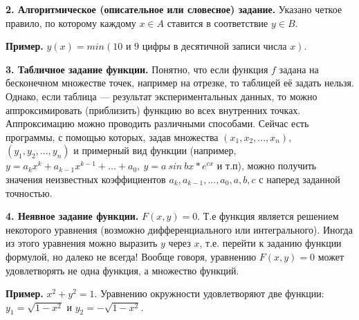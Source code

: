 \documentclass{article}
\begin{document}
    \textbf{2. Алгоритмическое (описательное или словесное) задание.} Указано четкое правило, по которому каждому $x \in A$ ставится в соответствие $y \in B$.
    
    \textbf{Пример.} $y(x) = min(10 \textrm{ и } 9 \textrm{ цифры в десятичной записи числа } x)$.

    \textbf{3. Табличное задание функции.} Понятно, что если функция $f$ задана на бесконечном множестве точек, например на отрезке, то таблицей её задать нельзя. Однако, если таблица --- результат экспериментальных данных, то можно аппроксимировать (приблизить) функцию во всех внутренних точках. Аппроксимацию можно проводить различными способами. Сейчас есть программы, с помощью которых, задав множества $(x_1, x_2, ..., x_n)$, $(y_1, y_2, ..., y_n)$ и примерный вид функции (например, $y = a_{k}x^{k} + a_{k - 1}x^{k - 1} + ... + a_{0},\ y = a\ sin\ bx * e^{cx}$ и т.п), можно получить значения неизвестных коэффициентов $a_k, a_{k-1}, ..., a_0, a, b, c$ с наперед заданной точностью.
    
    \textbf{4. Неявное задание функции.} $F(x, y) = 0$. Т.е функция является решением некоторого уравнения (возможно дифференциального или интегрального). Иногда из этого уравнения можно выразить $y$ через $x$, т.е. перейти к заданию функции формулой, но далеко не всегда! Вообще говоря, уравнению $F(x, y) = 0$ может удовлетворять не одна функция, а множество функций.
 
    \textbf{Пример.} $x^2 + y^2 = 1$. Уравнению окружности удовлетворяют две функции: $y_1 = \sqrt{1 - x^2}$ и $y_2 = -\sqrt{1 - x^2}$.
    
\end{document}
